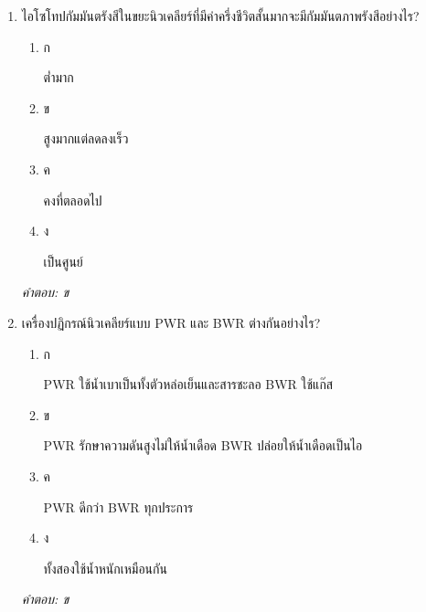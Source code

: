 \documentclass[12pt]{article}
\begin{document}
\begin{enumerate}[label=\arabic*., itemsep=0.5\baselineskip, topsep=0.5\baselineskip, leftmargin=*]
\item ไอโซโทปกัมมันตรังสีในขยะนิวเคลียร์ที่มีค่าครึ่งชีวิตสั้นมากจะมีกัมมันตภาพรังสีอย่างไร?
\begin{enumerate}[label=\alph*)., itemsep=0.3\baselineskip, topsep=0.3\baselineskip]
\item ก\ 
\begin{minipage}[t]{0.9\linewidth}
\raggedright ต่ำมาก
\end{minipage}
\item ข\ 
\begin{minipage}[t]{0.9\linewidth}
\raggedright สูงมากแต่ลดลงเร็ว
\end{minipage}
\item ค\ 
\begin{minipage}[t]{0.9\linewidth}
\raggedright คงที่ตลอดไป
\end{minipage}
\item ง\ 
\begin{minipage}[t]{0.9\linewidth}
\raggedright เป็นศูนย์
\end{minipage}
\end{enumerate}
\vspace{-0.3\baselineskip}
\begin{small}
\textit{คำตอบ: ข}
\end{small}

\item เครื่องปฏิกรณ์นิวเคลียร์แบบ PWR และ BWR ต่างกันอย่างไร?
\begin{enumerate}[label=\alph*)., itemsep=0.3\baselineskip, topsep=0.3\baselineskip]
\item ก\ 
\begin{minipage}[t]{0.9\linewidth}
\raggedright PWR ใช้น้ำเบาเป็นทั้งตัวหล่อเย็นและสารชะลอ BWR ใช้แก๊ส
\end{minipage}
\item ข\ 
\begin{minipage}[t]{0.9\linewidth}
\raggedright PWR รักษาความดันสูงไม่ให้น้ำเดือด BWR ปล่อยให้น้ำเดือดเป็นไอ
\end{minipage}
\item ค\ 
\begin{minipage}[t]{0.9\linewidth}
\raggedright PWR ดีกว่า BWR ทุกประการ
\end{minipage}
\item ง\ 
\begin{minipage}[t]{0.9\linewidth}
\raggedright ทั้งสองใช้น้ำหนักเหมือนกัน
\end{minipage}
\end{enumerate}
\vspace{-0.3\baselineskip}
\begin{small}
\textit{คำตอบ: ข}
\end{small}


\end{enumerate}
\end{document}
